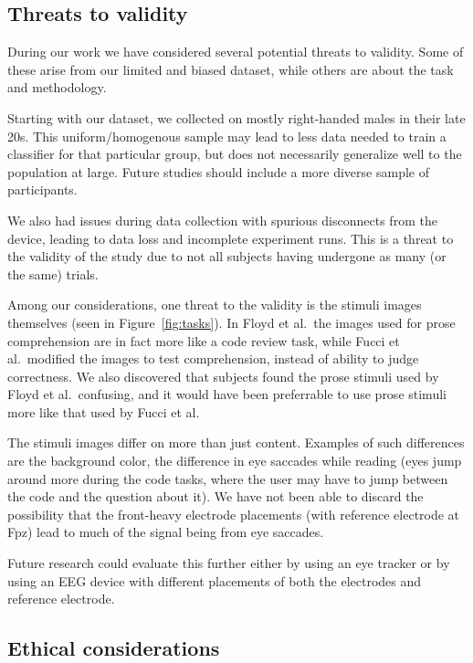 \subsection{Threats to validity}\label{section:threats}

    During our work we have considered several potential threats to validity. Some of these arise from our limited and biased dataset, while others are about the task and methodology.

    Starting with our dataset, we collected on mostly right-handed males in their late 20s. This uniform/homogenous sample may lead to less data needed to train a classifier for that particular group, but does not necessarily generalize well to the population at large. Future studies should include a more diverse sample of participants.

    We also had issues during data collection with spurious disconnects from the device, leading to data loss and incomplete experiment runs. This is a threat to the validity of the study due to not all subjects having undergone as many (or the same) trials.

    Among our considerations, one threat to the validity is the stimuli images themselves (seen in Figure~\ref{fig:tasks}). In Floyd et al.~the images used for prose comprehension are in fact more like a code review task, while Fucci et al.~modified the images to test comprehension, instead of ability to judge correctness. We also discovered that subjects found the prose stimuli used by Floyd et al.~confusing, and it would have been preferrable to use prose stimuli more like that used by Fucci et al.

    The stimuli images differ on more than just content. Examples of such differences are the background color, the difference in eye saccades while reading (eyes jump around more during the code tasks, where the user may have to jump between the code and the question about it). We have not been able to discard the possibility that the front-heavy electrode placements (with reference electrode at Fpz) lead to much of the signal being from eye saccades. 

    Future research could evaluate this further either by using an eye tracker or by using an EEG device with different placements of both the electrodes and reference electrode.


\subsection{Ethical considerations}

